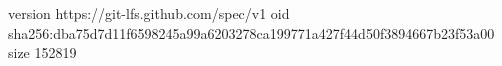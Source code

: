version https://git-lfs.github.com/spec/v1
oid sha256:dba75d7d11f6598245a99a6203278ca199771a427f44d50f3894667b23f53a00
size 152819
